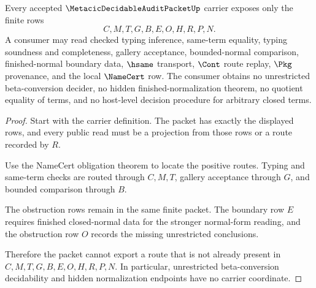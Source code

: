 \begin{theorem}
\label{thm:metacic-decidable-audit-packet-nonescape}
Every accepted $\MetacicDecidableAuditPacketUp$ carrier exposes only the finite rows
$$
C,M,T,G,B,E,O,H,R,P,N.
$$
A consumer may read checked typing inference, same-term equality, typing soundness and completeness, gallery acceptance, bounded-normal comparison, finished-normal boundary data, $\hsame$ transport, $\Cont$ route replay, $\Pkg$ provenance, and the local $\NameCert$ row. The consumer obtains no unrestricted beta-conversion decider, no hidden finished-normalization theorem, no quotient equality of terms, and no host-level decision procedure for arbitrary closed terms.
\end{theorem}
\begin{proof}
Start with the carrier definition. The packet has exactly the displayed rows, and every public read must be a projection from those rows or a route recorded by $R$.

Use the NameCert obligation theorem to locate the positive routes. Typing and same-term checks are routed through $C,M,T$, gallery acceptance through $G$, and bounded comparison through $B$.

The obstruction rows remain in the same finite packet. The boundary row $E$ requires finished closed-normal data for the stronger normal-form reading, and the obstruction row $O$ records the missing unrestricted conclusions.

Therefore the packet cannot export a route that is not already present in $C,M,T,G,B,E,O,H,R,P,N$. In particular, unrestricted beta-conversion decidability and hidden normalization endpoints have no carrier coordinate.
\end{proof}

